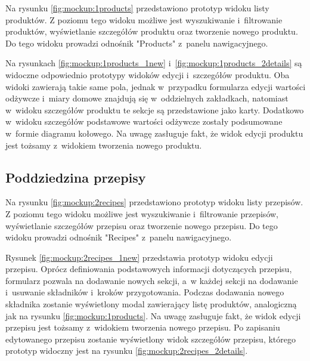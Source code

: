 Na rysunku \ref{fig:mockup:1products} przedstawiono prototyp widoku listy produktów.
Z poziomu tego widoku możliwe jest wyszukiwanie i~filtrowanie produktów, wyświetlanie szczegółów produktu oraz tworzenie nowego produktu.
Do tego widoku prowadzi odnośnik "Products" z~panelu nawigacyjnego.


Na rysunkach \ref{fig:mockup:1products_1new} i~\ref{fig:mockup:1products_2details} są widoczne odpowiednio prototypy widoków edycji i~szczegółów produktu.
Oba widoki zawierają takie same pola, jednak w~przypadku formularza edycji wartości odżywcze i~miary domowe znajdują się w~oddzielnych zakładkach,
natomiast w~widoku szczegółów produktu te sekcje są przedstawione jako karty.
Dodatkowo w~widoku szczegółów podstawowe wartości odżywcze zostały podsumowane w~formie diagramu kołowego.
Na uwagę zasługuje fakt, że widok edycji produktu jest tożsamy z~widokiem tworzenia nowego produktu.



\subsection{Poddziedzina przepisy}

Na rysunku \ref{fig:mockup:2recipes} przedstawiono prototyp widoku listy przepisów.
Z poziomu tego widoku możliwe jest wyszukiwanie i~filtrowanie przepisów, wyświetlanie szczegółów przepisu oraz tworzenie nowego przepisu.
Do tego widoku prowadzi odnośnik "Recipes" z~panelu nawigacyjnego.


Rysunek \ref{fig:mockup:2recipes_1new} przedstawia prototyp widoku edycji przepisu.
Oprócz definiowania podstawowych informacji dotyczących przepisu, formularz pozwala na dodawanie nowych sekcji, a~w każdej sekcji na dodawanie i~usuwanie składników i~kroków przygotowania.
Podczas dodawania nowego składnika zostanie wyświetlony modal zawierający listę produktów, analogiczną jak na rysunku \ref{fig:mockup:1products}.
Na uwagę zasługuje fakt, że widok edycji przepisu jest tożsamy z~widokiem tworzenia nowego przepisu.
Po zapisaniu edytowanego przepisu zostanie wyświetlony widok szczegółów przepisu, którego prototyp widoczny jest na rysunku \ref{fig:mockup:2recipes_2details}.

